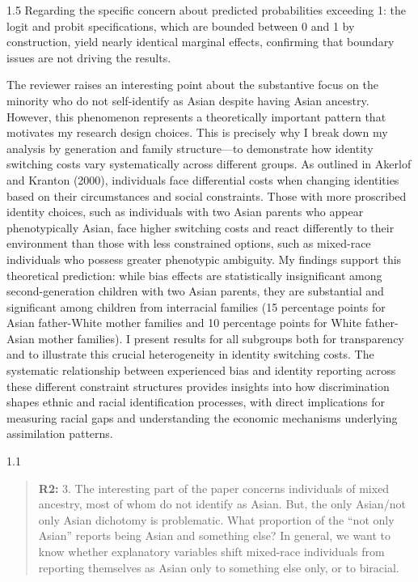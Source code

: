 \documentclass[12pt,english]{article}
\newcommand{\rrquote}{1.1}
\newcommand{\rrxspc}{1.5}
\begin{document}
\begin{refsection}
\begin{spacing}{\rrxspc}
            Regarding the specific concern about predicted probabilities exceeding 1: the logit and probit specifications, which are bounded between 0 and 1 by construction, yield nearly identical marginal effects, confirming that boundary issues are not driving the results.

            The reviewer raises an interesting point about the substantive focus on the minority who do not self-identify as Asian despite having Asian ancestry. However, this phenomenon represents a theoretically important pattern that motivates my research design choices. This is precisely why I break down my analysis by generation and family structure—to demonstrate how identity switching costs vary systematically across different groups. As outlined in Akerlof and Kranton (2000), individuals face differential costs when changing identities based on their circumstances and social constraints. Those with more proscribed identity choices, such as individuals with two Asian parents who appear phenotypically Asian, face higher switching costs and react differently to their environment than those with less constrained options, such as mixed-race individuals who possess greater phenotypic ambiguity. My findings support this theoretical prediction: while bias effects are statistically insignificant among second-generation children with two Asian parents, they are substantial and significant among children from interracial families (15 percentage points for Asian father-White mother families and 10 percentage points for White father-Asian mother families). I present results for all subgroups both for transparency and to illustrate this crucial heterogeneity in identity switching costs. The systematic relationship between experienced bias and identity reporting across these different constraint structures provides insights into how discrimination shapes ethnic and racial identification processes, with direct implications for measuring racial gaps and understanding the economic mechanisms underlying assimilation patterns.


        \end{spacing}

    \begin{spacing}{\rrquote}
        \begin{quotation}
        \textbf{R2: } 3. The interesting part of the paper concerns individuals of mixed ancestry, most of whom do not identify as Asian. But, the only Asian/not only Asian dichotomy is problematic. What proportion of the “not only Asian” reports being Asian and something else? In general, we want to know whether explanatory variables shift mixed-race individuals from reporting themselves as Asian only to something else only, or to biracial.
        \end{quotation}
        \end{spacing}
        

\end{refsection}
\end{document}
